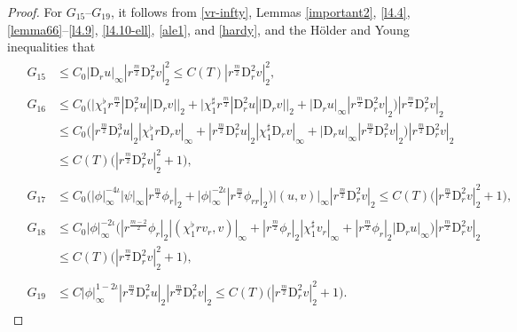 \documentclass[11pt,reqno]{amsart}
\numberwithin{rk}{section}
\numberwithin{prop}{section}
\numberwithin{mydef}{section}
\numberwithin{lem}{section}
\numberwithin{equation}{section}
\numberwithin{thm}{section}
\begin{document}
\begin{proof}
For $G_{15}$--$G_{19}$, it follows from \eqref{vr-infty}, Lemmas \ref{important2}, \ref{l4.4}, \ref{lemma66}--\ref{l4.9}, \ref{l4.10-ell}, \ref{ale1}, and \ref{hardy}, and the H\"older and Young inequalities that
\begin{align*}\label{G16-20}
&\begin{aligned}
G_{15}&\leq C_0|\mathrm{D}_r u|_\infty|r^\frac{m}{2}\mathrm{D}_r^2 v|_2^2 \leq C(T)|r^\frac{m}{2}\mathrm{D}_r^2 v|_2^2,     
\end{aligned}\\
&\begin{aligned}
G_{16}&\leq C_0\big(\big|\chi_1^\flat r^\frac{m}{2}|\mathrm{D}_r^2 u| |\mathrm{D}_r v|\big|_2+\big|\chi_1^\sharp r^\frac{m}{2}|\mathrm{D}_r^2 u| |\mathrm{D}_r v|\big|_2+|\mathrm{D}_r u|_\infty|r^\frac{m}{2}\mathrm{D}_r^2 v|_2\big)|r^\frac{m}{2}\mathrm{D}_r^2 v|_2\\
&\leq C_0\big( |r^\frac{m}{2} \mathrm{D}_r^3 u|_2 |\chi_1^\flat r\mathrm{D}_r v|_\infty+ |r^\frac{m}{2}\mathrm{D}_r^2 u|_2|\chi_1^\sharp \mathrm{D}_r v|_\infty+|\mathrm{D}_r u|_\infty|r^\frac{m}{2}\mathrm{D}_r^2 v|_2\big)|r^\frac{m}{2}\mathrm{D}_r^2 v|_2\\
&\leq C(T)\big(|r^\frac{m}{2}\mathrm{D}_r^2 v|_2^2 +1\big),
\end{aligned}\\
&\begin{aligned}
G_{17}&\leq C_0\big(|\phi|_\infty^{-4\iota}|\psi|_\infty|r^\frac{m}{2}\phi_{r}|_2 +|\phi|_\infty^{-2\iota}|r^\frac{m}{2}\phi_{rr}|_2\big)|(u,v)|_\infty|r^\frac{m}{2}\mathrm{D}_r^2 v|_2\leq C(T)\big(|r^\frac{m}{2}\mathrm{D}_r^2 v|_2^2 +1\big),
\end{aligned}\\
&\begin{aligned}
G_{18}&\leq C_0|\phi|_\infty^{-2\iota}\big(|r^{\frac{m-2}{2}}\phi_r|_2 |(\chi_1^\flat rv_r,v)|_\infty+|r^{\frac{m}{2}}\phi_r|_2 |\chi_1^\sharp v_r|_\infty+|r^{\frac{m}{2}}\phi_r|_2|\mathrm{D}_r u|_\infty\big) |r^\frac{m}{2}\mathrm{D}_r^2 v|_2 \\
&\leq C(T) \big(|r^\frac{m}{2}\mathrm{D}_r^2 v|_2^2+1\big),
\end{aligned}\\
&\begin{aligned}
G_{19}&\leq C|\phi|_\infty^{1-2\iota}|r^\frac{m}{2}\mathrm{D}_r^2 u|_2|r^\frac{m}{2}\mathrm{D}_r^2 v|_2\leq C(T) \big(|r^\frac{m}{2}\mathrm{D}_r^2 v|_2^2+1\big).
\end{aligned}
\end{align*}


\end{proof}
\end{document}
